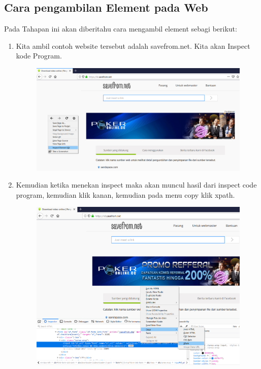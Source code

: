 \subsection{Cara pengambilan Element pada Web }
    Pada Tahapan ini akan diberitahu cara mengambil element sebagi berikut:

\begin{enumerate}
    \item Kita ambil contoh website tersebut adalah savefrom.net. Kita akan Inspect kode Program.
\begin{figure}[!htbp]
    \centering
    \includegraphics[scale=0.3]{figure/inspect.png}
    \label{gambar 1}
\end{figure}
    \item Kemudian ketika menekan inspect maka akan muncul hasil dari inspect code program, kemudian klik kanan, kemudian pada menu copy klik xpath.
\begin{figure}[!htbp]
    \centering
    \includegraphics[scale=0.3]{figure/hasil1.png}
    \label{gambar 4}
\end{figure}
\end{enumerate}
  

